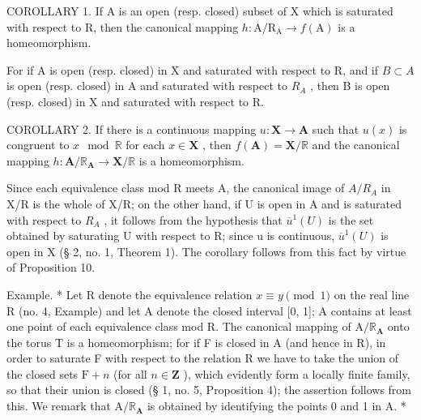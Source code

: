 COROLLARY 1. If A is an open (resp. closed) subset of X which is saturated with respect to R, then the canonical mapping \(h: \mathrm{A}/\mathrm{R}_{\mathrm{A}} \rightarrow f(\mathrm{A})\) is a homeomorphism.

For if A is open (resp. closed) in X and saturated with respect to R, and if \(B \subset A\) is open (resp. closed) in A and saturated with respect to \(R_{A}\) , then B is open (resp. closed) in X and saturated with respect to R.

COROLLARY 2. If there is a continuous mapping \(u: \mathbf{X} \to \mathbf{A}\) such that \(u(x)\) is congruent to \(x \mod \mathbb{R}\) for each \(x \in \mathbf{X}\) , then \(f(\mathbf{A}) = \mathbf{X} / \mathbb{R}\) and the canonical mapping \(h: \mathbf{A} / \mathbb{R}_{\mathbf{A}} \to \mathbf{X} / \mathbb{R}\) is a homeomorphism.

Since each equivalence class mod R meets A, the canonical image of \(A/R_{A}\) in X/R is the whole of X/R; on the other hand, if U is open in A and is saturated with respect to \(R_{A}\) , it follows from the hypothesis that \(\overline{u}^{1}(U)\) is the set obtained by saturating U with respect to R; since u is continuous, \(\overline{u}^{1}(U)\) is open in X (§ 2, no. 1, Theorem 1). The corollary follows from this fact by virtue of Proposition 10.

Example. * Let R denote the equivalence relation \(x \equiv y \pmod{1}\) on the real line R (no. 4, Example) and let A denote the closed interval {[}0, 1{]}; A contains at least one point of each equivalence class mod R. The canonical mapping of \(\mathrm{A} / \mathbb{R}_{\mathbf{A}}\) onto the torus T is a homeomorphism; for if F is closed in A (and hence in R), in order to saturate F with respect to the relation R we have to take the union of the closed sets \(\mathrm{F} + n\) (for all \(n \in \mathbf{Z}\) ), which evidently form a locally finite family, so that their union is closed (§ 1, no. 5, Proposition 4); the assertion follows from this. We remark that \(\mathrm{A} / \mathbb{R}_{\mathbf{A}}\) is obtained by identifying the points 0 and 1 in A. *

